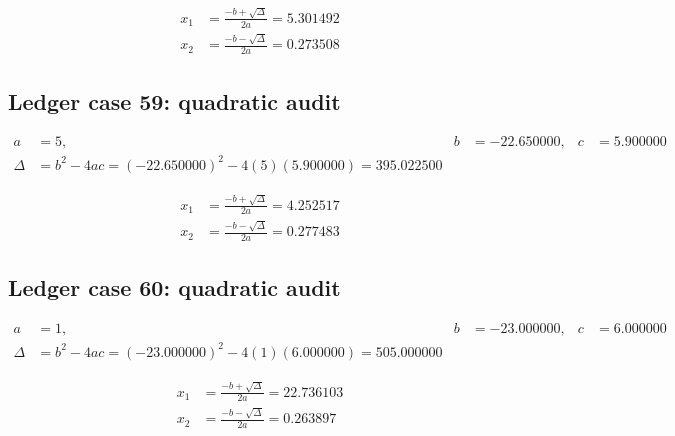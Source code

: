\documentclass[11pt,a4paper]{article}
\begin{document}
\begin{align}
x_1 &= \frac{-b+\sqrt{\Delta}}{2a} = 5.301492 \\
x_2 &= \frac{-b-\sqrt{\Delta}}{2a} = 0.273508
\end{align}

\subsection{Ledger case 59: quadratic audit}
\begin{align}
a &= 5, & b &= -22.650000, & c &= 5.900000 \\
\Delta &= b^2-4ac = (-22.650000)^2 - 4(5)(5.900000) = 395.022500
\end{align}

\begin{align}
x_1 &= \frac{-b+\sqrt{\Delta}}{2a} = 4.252517 \\
x_2 &= \frac{-b-\sqrt{\Delta}}{2a} = 0.277483
\end{align}

\subsection{Ledger case 60: quadratic audit}
\begin{align}
a &= 1, & b &= -23.000000, & c &= 6.000000 \\
\Delta &= b^2-4ac = (-23.000000)^2 - 4(1)(6.000000) = 505.000000
\end{align}

\begin{align}
x_1 &= \frac{-b+\sqrt{\Delta}}{2a} = 22.736103 \\
x_2 &= \frac{-b-\sqrt{\Delta}}{2a} = 0.263897
\end{align}

\newpage
\end{document}
